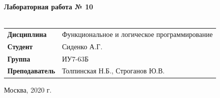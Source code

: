 \documentclass[a4paper,14pt]{extreport} %
\begin{document}
\begin{titlepage}
    \vspace{4cm}

    \begin{center}
        \textbf{Лабораторная работа № 10} \\
        \vspace{0.5cm}
        \textbf{} \\
    \end{center}

    \vspace{4cm}

    \begin{flushleft}
        \begin{tabular}{ll}
            \textbf{Дисциплина} & Функциональное и логическое программирование \\
            \textbf{Студент} & Сиденко А.Г. \\
            \textbf{Группа} & ИУ7-63Б \\
            \textbf{Преподаватель} & Толпинская Н.Б., Строганов Ю.В.  \\
        \end{tabular}
    \end{flushleft}

    \vspace{4cm}

   \begin{center}
        Москва, 2020 г.
    \end{center}

\end{titlepage}
\end{document}
